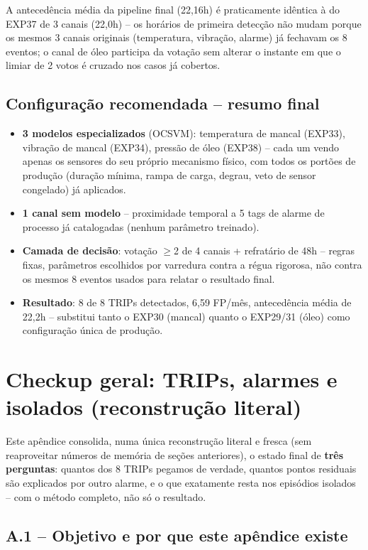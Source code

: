 \documentclass[11pt,a4paper]{article}
\begin{document}
A antecedência média da pipeline final (22,16h) é praticamente
idêntica à do EXP37 de 3 canais (22,0h) -- os horários de primeira
detecção não mudam porque os mesmos 3 canais originais (temperatura,
vibração, alarme) já fechavam os 8 eventos; o canal de óleo participa
da votação sem alterar o instante em que o limiar de 2 votos é
cruzado nos casos já cobertos.

\subsection{Configuração recomendada -- resumo final}

\begin{itemize}
  \item \textbf{3 modelos especializados} (OCSVM): temperatura de
    mancal (EXP33), vibração de mancal (EXP34), pressão de óleo
    (EXP38) -- cada um vendo apenas os sensores do seu próprio
    mecanismo físico, com todos os portões de produção (duração
    mínima, rampa de carga, degrau, veto de sensor congelado) já
    aplicados.
  \item \textbf{1 canal sem modelo} -- proximidade temporal a 5 tags
    de alarme de processo já catalogadas (nenhum parâmetro treinado).
  \item \textbf{Camada de decisão}: votação $\geq$2 de 4 canais +
    refratário de 48h -- regras fixas, parâmetros escolhidos por
    varredura contra a régua rigorosa, não contra os mesmos 8 eventos
    usados para relatar o resultado final.
  \item \textbf{Resultado}: 8 de 8 TRIPs detectados, 6,59 FP/mês,
    antecedência média de 22,2h -- substitui tanto o EXP30 (mancal)
    quanto o EXP29/31 (óleo) como configuração única de produção.
\end{itemize}

\appendix
\section{Checkup geral: TRIPs, alarmes e isolados (reconstrução literal)}
\label{sec:apendiceA}

Este apêndice consolida, numa única reconstrução literal e fresca
(sem reaproveitar números de memória de seções anteriores), o estado
final de \textbf{três perguntas}: quantos dos 8 TRIPs pegamos de
verdade, quantos pontos residuais são explicados por outro alarme, e o
que exatamente resta nos episódios isolados -- com o método completo,
não só o resultado.

\subsection{A.1 -- Objetivo e por que este apêndice existe}
\end{document}
